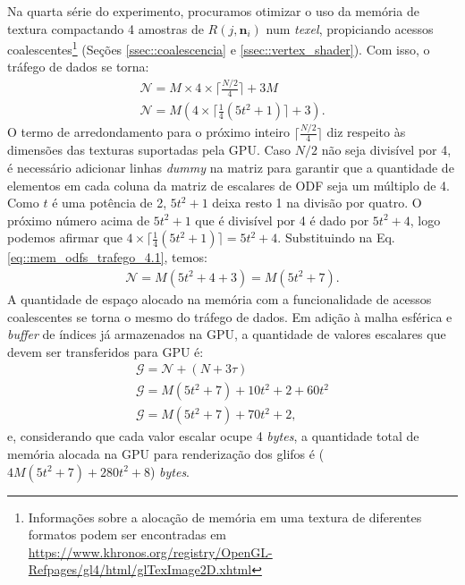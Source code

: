 Na quarta série do experimento, procuramos otimizar o uso da memória de textura compactando 4 amostras de $R(j, \mathbf{n}_i)$ num \textit{texel}, propiciando acessos coalescentes\footnote{Informações sobre a alocação de memória em uma textura de diferentes formatos podem ser encontradas em \url{https://www.khronos.org/registry/OpenGL-Refpages/gl4/html/glTexImage2D.xhtml}} (Seções \ref{ssec::coalescencia} e \ref{ssec::vertex_shader}). Com isso, o tráfego de dados se torna:
\begin{equation}
\label{eq::mem_odfs_trafego_4.1}
\begin{array}{l}
    \mathscr{N} =  M\times 4 \times \lceil\frac{N/2}{4}\rceil + 3M \\
    \mathscr{N} =  M( 4 \times \lceil \frac{1}{4}(5t^2 + 1)\rceil + 3) . %
    \end{array}
\end{equation}
O termo de arredondamento para o próximo inteiro $\lceil\frac{N/2}{4}\rceil$ diz respeito às dimensões das texturas suportadas pela GPU. Caso $N/2$ não seja divisível por 4, é necessário adicionar linhas \textit{dummy} na matriz para garantir que a quantidade de elementos em cada coluna da matriz de escalares de ODF seja um múltiplo de 4. Como $t$ é uma potência de 2, $5t^2 + 1$ deixa resto 1 na divisão por quatro. O próximo número acima de $5t^2 + 1$ que é divisível por 4 é dado por $5t^2 + 4$, logo podemos afirmar que $4 \times \lceil \frac{1}{4}(5t^2 + 1)\rceil = 5t^2 + 4$. Substituindo na Eq. \ref{eq::mem_odfs_trafego_4.1}, temos:
\begin{equation}
\label{eq::mem_odfs_trafego_4.2}
\begin{array}{l}
    \mathscr{N} =  M (5t^2 + 4 + 3) = M (5t^2 + 7).
    \end{array}
\end{equation}
A quantidade de espaço alocado na memória com a funcionalidade de acessos coalescentes se torna o mesmo do tráfego de dados. Em adição à malha esférica e \textit{buffer} de índices já armazenados na GPU, a quantidade de valores escalares que devem ser transferidos para GPU é:
\begin{equation}
\label{eq::mem_odfs_ocupancia_4.1}
\begin{array}{l}
    \mathscr{G} =  \mathscr{N} + (N + 3\tau) \\
    \mathscr{G} =   M (5t^2 + 7) + 10 t^2 + 2 + 60t^2\\
    \mathscr{G} = M(5t^2 + 7) + 70 t^2 + 2 ,
    \end{array}
\end{equation}
e, considerando que cada valor escalar ocupe 4 \textit{bytes}, a quantidade total de memória alocada na GPU para renderização dos glifos é ($4M(5t^2 + 7) + 280t^2 + 8$) \textit{bytes}.


